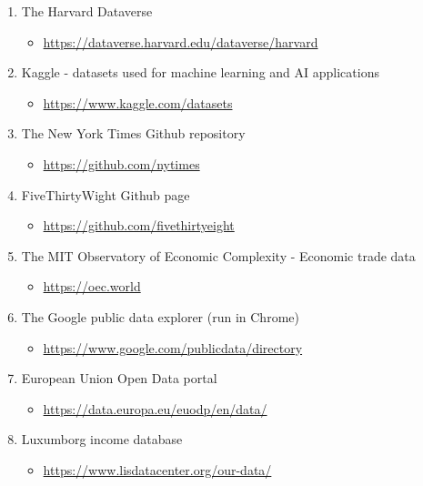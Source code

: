 \documentclass[
]{book}
\providecommand{\tightlist}{%
  \setlength{\itemsep}{0pt}\setlength{\parskip}{0pt}}
\begin{document}
\begin{enumerate}
\def\labelenumi{\arabic{enumi}.}
\tightlist
\item
  The Harvard Dataverse

  \begin{itemize}
  \tightlist
  \item
    \url{https://dataverse.harvard.edu/dataverse/harvard}
  \end{itemize}
\item
  Kaggle - datasets used for machine learning and AI applications

  \begin{itemize}
  \tightlist
  \item
    \url{https://www.kaggle.com/datasets}
  \end{itemize}
\item
  The New York Times Github repository

  \begin{itemize}
  \tightlist
  \item
    \url{https://github.com/nytimes}
  \end{itemize}
\item
  FiveThirtyWight Github page

  \begin{itemize}
  \tightlist
  \item
    \url{https://github.com/fivethirtyeight}
  \end{itemize}
\item
  The MIT Observatory of Economic Complexity - Economic trade data

  \begin{itemize}
  \tightlist
  \item
    \url{https://oec.world}
  \end{itemize}
\item
  The Google public data explorer (run in Chrome)

  \begin{itemize}
  \tightlist
  \item
    \url{https://www.google.com/publicdata/directory}
  \end{itemize}
\item
  European Union Open Data portal

  \begin{itemize}
  \tightlist
  \item
    \url{https://data.europa.eu/euodp/en/data/}
  \end{itemize}
\item
  Luxumborg income database

  \begin{itemize}
  \tightlist
  \item
    \url{https://www.lisdatacenter.org/our-data/}
  \end{itemize}
\end{enumerate}
\end{document}
